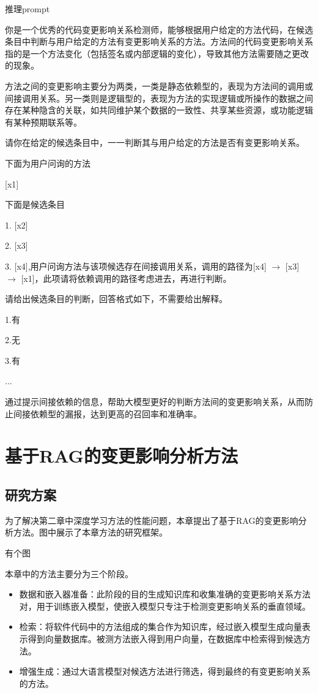 \begin{promptbox}{推理prompt}

你是一个优秀的代码变更影响关系检测师，能够根据用户给定的方法代码，在候选条目中判断与用户给定的方法有变更影响关系的方法。方法间的代码变更影响关系指的是一个方法变化（包括签名或内部逻辑的变化），导致其他方法需要随之更改的现象。

方法之间的变更影响主要分为两类，一类是静态依赖型的，表现为方法间的调用或间接调用关系。另一类则是逻辑型的，表现为方法的实现逻辑或所操作的数据之间存在某种隐含的关联，如共同维护某个数据的一致性、共享某些资源，或功能逻辑有某种预期联系等。

请你在给定的候选条目中，一一判断其与用户给定的方法是否有变更影响关系。

下面为用户问询的方法

[x1]

下面是候选条目

1. [x2]

2. [x3]

3. [x4],用户问询方法与该项候选存在间接调用关系，调用的路径为[x4] $\rightarrow$ [x3] $\rightarrow$ [x1]，此项请将依赖调用的路径考虑进去，再进行判断。


请给出候选条目的判断，回答格式如下，不需要给出解释。

1.有 

2.无 

3.有

    ...
    
\end{promptbox}

通过提示间接依赖的信息，帮助大模型更好的判断方法间的变更影响关系，从而防止间接依赖型的漏报，达到更高的召回率和准确率。


\section{基于RAG的变更影响分析方法}

\subsection{研究方案}

为了解决第二章中深度学习方法的性能问题，本章提出了基于RAG的变更影响分析方法。图中展示了本章方法的研究框架。

有个图

本章中的方法主要分为三个阶段。

\begin{itemize}

    \item 数据和嵌入器准备：此阶段的目的生成知识库和收集准确的变更影响关系方法对，用于训练嵌入模型，使嵌入模型只专注于检测变更影响关系的垂直领域。

    \item 检索：将软件代码中的方法组成的集合作为知识库，经过嵌入模型生成向量表示得到向量数据库。被测方法嵌入得到用户向量，在数据库中检索得到候选方法。
    
    \item 增强生成：通过大语言模型对候选方法进行筛选，得到最终的有变更影响关系的方法。
    
\end{itemize}


